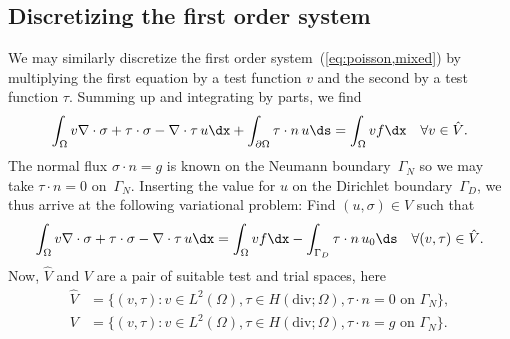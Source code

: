 \subsection{Discretizing the first order system}

We may similarly discretize the first order
system~(\ref{eq:poisson,mixed}) by multiplying the first equation by
a test function $v$ and the second by a test function $\tau$. Summing up
and integrating by parts, we find
\begin{displaymath}
  \int_{\Omega} v \nabla \cdot \sigma + \tau \cdot \sigma
  - \nabla \cdot \tau \, u \dx +
  \int_{\partial\Omega} \tau \cdot n \, u \ds
  = \int_{\Omega} v f \dx
  \quad \forall v \in \hat{V}.
\end{displaymath}
The normal flux $\sigma \cdot n = g$ is known on the Neumann
boundary~$\Gamma_N$ so we may take $\tau \cdot n = 0$ on~$\Gamma_N$.
Inserting the value for $u$ on the Dirichlet boundary~$\Gamma_D$, we
thus arrive at the following variational problem:
Find $(u, \sigma) \in V$ such that
\begin{equation} \label{eq:poisson,varproblem,mixed}
  \int_{\Omega} v \nabla \cdot \sigma + \tau \cdot \sigma
  - \nabla \cdot \tau \, u \dx
  = \int_{\Omega} v f \dx - \int_{\Gamma_D} \tau \cdot n \, u_0 \ds
  \quad \forall (v, \tau) \in \hat{V}.
\end{equation}
Now, $\hat{V}$ and $V$ are a pair of suitable test and trial
spaces, here
\begin{displaymath}
  \begin{split}
    \hat{V} &= \{(v, \tau) : v \in L^2(\Omega), \tau \in H(\mathrm{div};\Omega), \tau \cdot n = 0 \mbox{ on } \Gamma_N\}, \\
    V       &= \{(v, \tau) : v \in L^2(\Omega), \tau \in H(\mathrm{div};\Omega), \tau \cdot n = g \mbox{ on } \Gamma_N\}.
  \end{split}
\end{displaymath}

